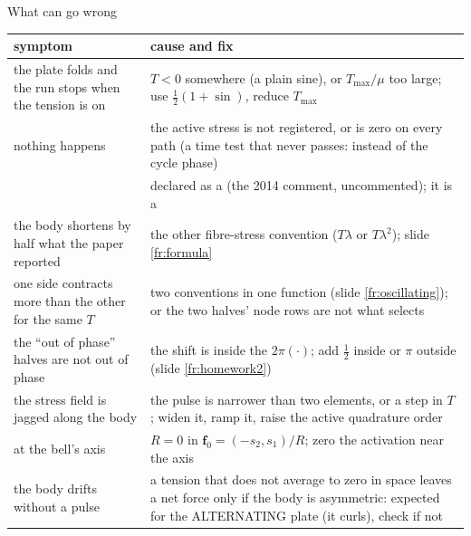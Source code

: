 \documentclass[aspectratio=169,11pt]{beamer}
\begin{document}
\begin{frame}{What can go wrong}
\label{fr:wrong}
\scriptsize
\begin{tabular}{@{}L{0.40\textwidth}L{0.52\textwidth}@{}}
\toprule
symptom & cause and fix \\
\midrule
the plate folds and the run stops when the tension is on & $T < 0$ somewhere (a plain sine), or $T_{\max}/\mu$ too large; use $\tfrac12(1 + \sin)$, reduce $T_{\max}$ \\
nothing happens & the active stress is not registered, or  is zero on every path (a time test that never passes:  instead of the cycle phase) \\
 &  declared as a  (the 2014 comment, uncommented); it is a  \\
the body shortens by half what the paper reported & the other fibre-stress convention ($T\lambda$ or $T\lambda^2$); slide \ref{fr:formula} \\
one side contracts more than the other for the same $T$ & two conventions in one function (slide \ref{fr:oscillating}); or the two halves' node rows are not what  selects \\
the ``out of phase'' halves are not out of phase & the shift is inside the $2\pi(\cdot)$; add $\tfrac12$ inside or $\pi$ outside (slide \ref{fr:homework2}) \\
the stress field is jagged along the body & the pulse is narrower than two elements, or a step in $T$; widen it, ramp it, raise the active quadrature order \\
 at the bell's axis & $R = 0$ in $\mathbf{f}_0 = (-s_2, s_1)/R$; zero the activation near the axis \\
the body drifts without a pulse & a tension that does not average to zero in space leaves a net force only if the body is asymmetric: expected for the ALTERNATING plate (it curls), check  if not \\
\bottomrule
\end{tabular}

\end{frame}
\end{document}
